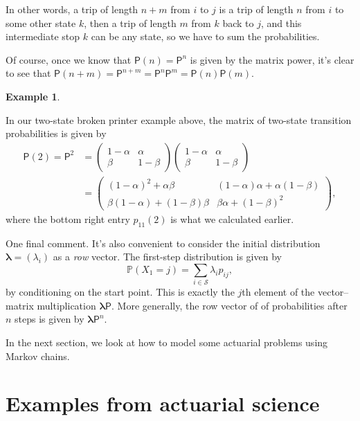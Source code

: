 \documentclass[
  a4paper,
]{article}
\theoremstyle{definition}
\theoremstyle{definition}
\newtheorem{example}{Example}[section]
\theoremstyle{definition}
\theoremstyle{remark}
\begin{document}
In other words, a trip of length \(n + m\) from \(i\) to \(j\) is a trip of length \(n\) from \(i\) to some other state \(k\), then a trip of length \(m\) from \(k\) back to \(j\), and this intermediate stop \(k\) can be any state, so we have to sum the probabilities.

Of course, once we know that \(\mathsf P(n) = \mathsf P^n\) is given by the matrix power, it's clear to see that \(\mathsf P(n+m) = \mathsf P^{n+m} = \mathsf P^n \mathsf P^m = \mathsf P(n)\mathsf P(m)\).

\begin{example}
\protect\hypertarget{exm:printer2}{}\label{exm:printer2}

In our two-state broken printer example above, the matrix of two-state transition probabilities is given by
\begin{align*}
\mathsf P(2) = \mathsf P^2 &=  \begin{pmatrix} 1-\alpha & \alpha \\ \beta & 1-\beta \end{pmatrix}  \begin{pmatrix} 1-\alpha & \alpha \\ \beta & 1-\beta \end{pmatrix} \\
&=  \begin{pmatrix} (1-\alpha)^2 + \alpha\beta & (1-\alpha)\alpha + \alpha(1-\beta) \\ \beta(1-\alpha) + (1-\beta)\beta & \beta\alpha + (1-\beta)^2 \end{pmatrix} ,
\end{align*}
where the bottom right entry \(p_{11}(2)\) is what we calculated earlier.

\end{example}

One final comment. It's also convenient to consider the initial distribution \(\boldsymbol\lambda = (\lambda_i)\) as a \emph{row} vector. The first-step distribution is given by
\[ \mathbb P(X_1 = j) = \sum_{i \in \mathcal S} \lambda_i p_{ij} , \]
by conditioning on the start point.
This is exactly the \(j\)th element of the vector--matrix multiplication \(\boldsymbol\lambda \mathsf P\). More generally, the row vector of of probabilities after \(n\) steps is given by \(\boldsymbol\lambda \mathsf P^n\).

In the next section, we look at how to model some actuarial problems using Markov chains.

\hypertarget{S06-examples}{%
\section{Examples from actuarial science}\label{S06-examples}}
\end{document}
